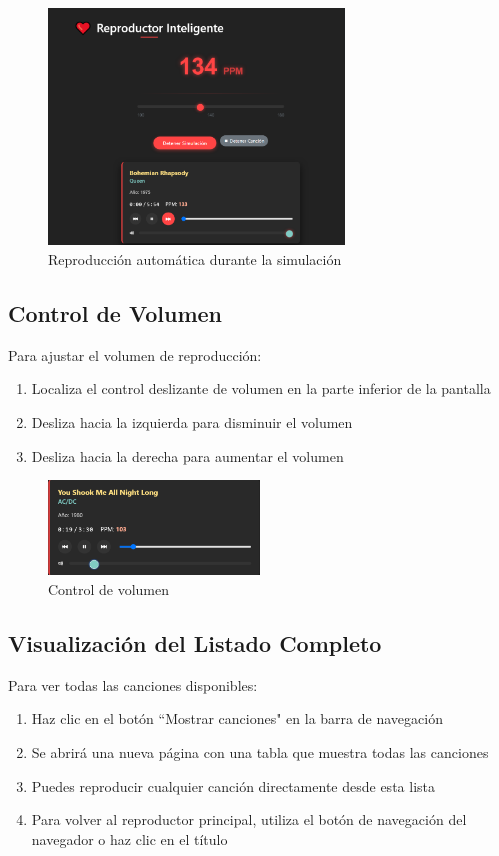 \documentclass[a4paper,12pt]{article}
\begin{document}
 \begin{figure}[h]
     \centering
     \includegraphics[width=0.7\textwidth]{imagenes/reproduccion_automatica.png}
     \caption{Reproducción automática durante la simulación}
 \end{figure}

\subsection{Control de Volumen}
Para ajustar el volumen de reproducción:
\begin{enumerate}
    \item Localiza el control deslizante de volumen en la parte inferior de la pantalla
    \item Desliza hacia la izquierda para disminuir el volumen
    \item Desliza hacia la derecha para aumentar el volumen
\end{enumerate}

 \begin{figure}[h]
     \centering
     \includegraphics[width=0.5\textwidth]{imagenes/control_volumen.png}
     \caption{Control de volumen}
 \end{figure}

\subsection{Visualización del Listado Completo}
Para ver todas las canciones disponibles:
\begin{enumerate}
    \item Haz clic en el botón ``Mostrar canciones" en la barra de navegación
    \item Se abrirá una nueva página con una tabla que muestra todas las canciones
    \item Puedes reproducir cualquier canción directamente desde esta lista
    \item Para volver al reproductor principal, utiliza el botón de navegación del navegador o haz clic en el título
\end{enumerate}
\end{document}
